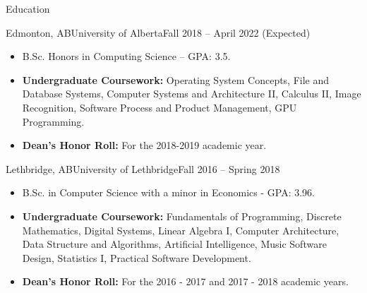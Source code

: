\documentclass[]{mcdowellcv}
\begin{document}
\makeheader

\begin{cvsection}{ Education}
  \begin{cvsubsection}{Edmonton, AB}{University of Alberta}{Fall 2018 -- April 2022 (Expected)}
    \begin{itemize}
      \item B.Sc. Honors in Computing Science -- GPA: 3.5.
      \item \textbf{Undergraduate Coursework:} Operating System Concepts, File and Database Systems,
        Computer Systems and Architecture II, Calculus II, Image Recognition, Software Process and Product Management, GPU Programming.
      \item \textbf{Dean's Honor Roll:} For the 2018-2019 academic year. 
    \end{itemize}
  \end{cvsubsection}

  \begin{cvsubsection}{Lethbridge, AB}{University of Lethbridge}{Fall 2016 -- Spring 2018}
    \begin{itemize}   
      \item B.Sc. in Computer Science with a minor in Economics - GPA: 3.96.
      \item \textbf{Undergraduate Coursework:} Fundamentals of Programming, Discrete Mathematics, 
        Digital Systems, Linear Algebra I, Computer Architecture, Data Structure and Algorithms, 
        Artificial Intelligence, Music Software Design, Statistics I, Practical Software Development.
      \item \textbf{Dean's Honor Roll:} For the 2016 - 2017 and 2017 - 2018 academic years.
    \end{itemize}
  \end{cvsubsection}
\end{cvsection}

\vspace*{-10pt}
\end{document}
